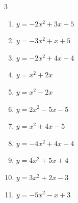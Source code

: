 \begin{multicols}{3}
\begin{enumerate}
\columnbreak %

\resetques

  \item $\displaystyle y=-2x^{2}+3x-5$


  \item $\displaystyle y=-3x^{2}+x+5$


  \item $\displaystyle y=-2x^{2}+4x-4$

        \phantom{$\displaystyle 頂点\left( 1 , -2 \right)$}

  \item $\displaystyle y=x^{2}+2x$

        \phantom{$\displaystyle 頂点\left( -1 , -1 \right)$}

  \item $\displaystyle y=x^{2}-2x$

        \phantom{$\displaystyle 頂点\left( 1 , -1 \right)$}

\columnbreak %

  \item $\displaystyle y=2x^{2}-5x-5$


  \item $\displaystyle y=x^{2}+4x-5$

        \phantom{$\displaystyle 頂点\left( -2 , -9 \right)$}

  \item $\displaystyle y=-4x^{2}+4x-4$


  \item $\displaystyle y=4x^{2}+5x+4$


  \item $\displaystyle y=3x^{2}+2x-3$


\columnbreak %

  \item $\displaystyle y=-5x^{2}-x+3$


\end{enumerate}
\end{multicols}
